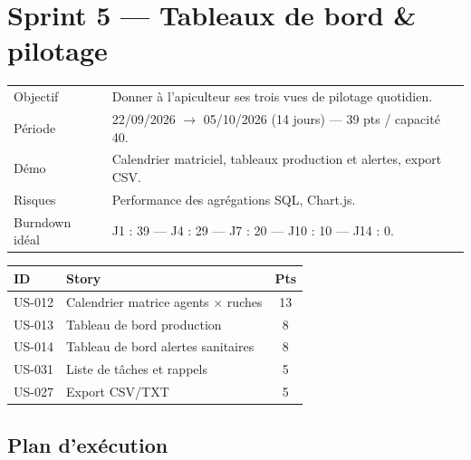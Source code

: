 \section{Sprint 5 --- Tableaux de bord \& pilotage}

\begin{center}
\begin{tabular}{lp{11cm}}
\toprule
Objectif  & Donner à l'apiculteur ses trois vues de pilotage quotidien. \\
Période   & 22/09/2026 $\rightarrow$ 05/10/2026 (14 jours) --- 39 pts / capacité 40. \\
Démo      & Calendrier matriciel, tableaux production et alertes,
            export CSV. \\
Risques   & Performance des agrégations SQL, Chart.js. \\
Burndown idéal & J1 : 39 --- J4 : 29 --- J7 : 20 --- J10 : 10 --- J14 : 0. \\
\bottomrule
\end{tabular}
\end{center}

\begin{center}
\begin{tabular}{lp{9cm}c}
\toprule
\textbf{ID} & \textbf{Story} & \textbf{Pts} \\
\midrule
US-012 & Calendrier matrice agents $\times$ ruches & 13 \\
US-013 & Tableau de bord production                & 8 \\
US-014 & Tableau de bord alertes sanitaires        & 8 \\
US-031 & Liste de tâches et rappels                & 5 \\
US-027 & Export CSV/TXT                            & 5 \\
\bottomrule
\end{tabular}
\end{center}

\subsection{Plan d'exécution}


